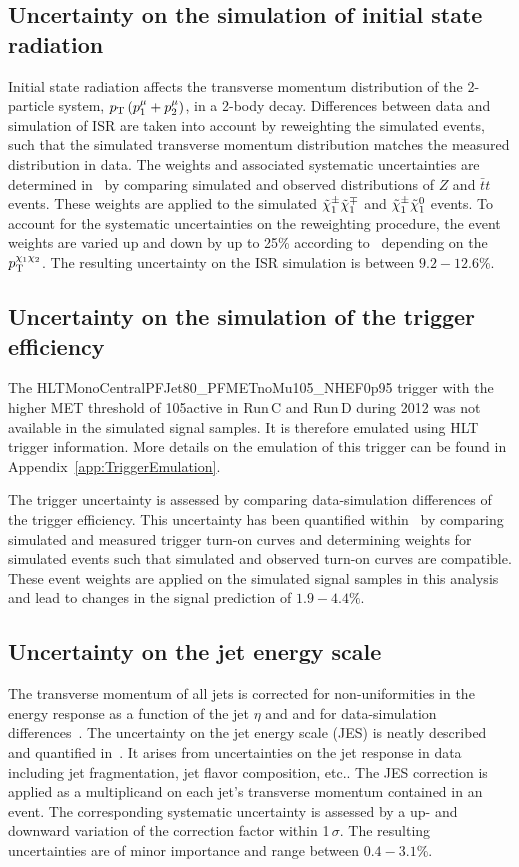 \subsection*{Uncertainty on the simulation of initial state radiation}
Initial state radiation affects the transverse momentum distribution of the 2-particle system, $p_{\text{T}}\left(p_1^{\mu} + p_2^{\mu} \right)$, in a 2-body decay.
Differences between data and simulation of ISR are taken into account by reweighting the simulated events, such that the simulated transverse momentum distribution matches the measured distribution in data. 
The weights and associated systematic uncertainties are determined in~\cite{bib:CMS:ISR_AN} by comparing simulated and observed \pt distributions of $Z$ and $\bar{t}t$ events.
These weights are applied to the simulated $\tilde{\chi}^{\pm}_{1}\tilde{\chi}^{\mp}_{1}$ and $\tilde{\chi}^{\pm}_{1}\tilde{\chi}^{0}_{1}$ events.
To account for the systematic uncertainties on the reweighting procedure, the event weights are varied up and down by up to 25\% according to~\cite{bib:CMS:ISR_AN} depending on the $p_{\text{T}}^{\chi_1\chi_2}$.
The resulting uncertainty on the ISR simulation is between $9.2-12.6\%$.

\subsection*{Uncertainty on the simulation of the trigger efficiency}
The HLTMonoCentralPFJet80\_PFMETnoMu105\_NHEF0p95 trigger with the higher MET threshold of 105\gev active in Run\,C and Run\,D during 2012 was not available in the simulated signal samples.
It is therefore emulated using HLT trigger information. 
More details on the emulation of this trigger can be found in Appendix~\ref{app:TriggerEmulation}.

The trigger uncertainty is assessed by comparing data-simulation differences of the trigger efficiency.
This uncertainty has been quantified within~\cite{bib:CMS:DT_Thesis,bib:CMS:DT_8TeV_AN} by comparing simulated and measured trigger turn-on curves and determining weights for simulated events such that simulated and observed turn-on curves are compatible.
These event weights are applied on the simulated signal samples in this analysis and lead to changes in the signal prediction of $1.9-4.4\%$.

\subsection*{Uncertainty on the jet energy scale}
The transverse momentum of all jets is corrected for non-uniformities in the energy response as a function of the jet $\eta$ and \pt and for data-simulation differences~\cite{bib:CMS:JME_PAS}.
The uncertainty on the jet energy scale (JES) is neatly described and quantified in~\cite{bib:CMS:JME_PAS}. 
It arises from uncertainties on the jet response in data including jet fragmentation, jet flavor composition, etc..
The JES correction is applied as a multiplicand on each jet's transverse momentum contained in an event.
The corresponding systematic uncertainty is assessed by a up- and downward variation of the correction factor within 1\,$\sigma$.
The resulting uncertainties are of minor importance and range between $0.4-3.1\%$.

